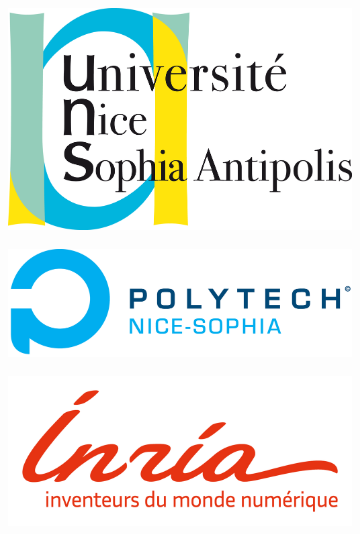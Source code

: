 \begin{titlepage} %
	
	\newcommand{\HRule}{\rule{\linewidth}{0.5mm}} %
	
	\begin{figure}[h!]
		\centering
		\hfill
		\begin{subfigure}[b]{0.25\linewidth}
			\includegraphics[width=\linewidth]{pics/unice.png}
		\end{subfigure}
		\hfill
		\begin{subfigure}[b]{0.28\linewidth}
			\includegraphics[width=\linewidth]{pics/polytech.png}
		\end{subfigure}
		\hfill
		\begin{subfigure}[b]{0.28\linewidth}
			\includegraphics[width=\linewidth]{pics/inria.png}
		\end{subfigure}
		\hfill
	\end{figure}
	

\end{titlepage}

